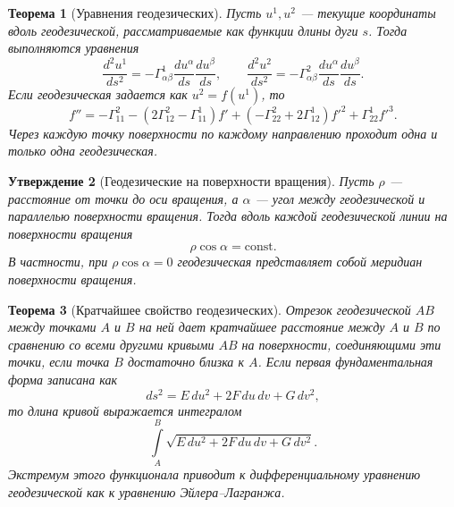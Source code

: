 \documentclass[12pt,a4paper]{article}
\newtheorem{theorem}{Теорема}[section]
\newtheorem{proposition}[theorem]{Утверждение}
\theoremstyle{definition}
\begin{document}
\begin{theorem}[Уравнения геодезических]
Пусть $u^1,u^2$ --- текущие координаты вдоль геодезической, рассматриваемые как функции длины дуги $s$. Тогда выполняются уравнения
\[
\frac{d^2u^1}{ds^2} = -\Gamma_{\alpha\beta}^1 \frac{du^\alpha}{ds}\frac{du^\beta}{ds}, \qquad
\frac{d^2u^2}{ds^2} = -\Gamma_{\alpha\beta}^2 \frac{du^\alpha}{ds}\frac{du^\beta}{ds}.
\]
Если геодезическая задается как $u^2=f(u^1)$, то
\[
f'' = -\Gamma_{11}^2 - (2\Gamma_{12}^2 - \Gamma_{11}^1) f' + (-\Gamma_{22}^2 + 2\Gamma_{12}^1) f'^2 + \Gamma_{22}^1 f'^3.
\]
Через каждую точку поверхности по каждому направлению проходит одна и только одна геодезическая.
\end{theorem}

\begin{proposition}[Геодезические на поверхности вращения]
Пусть $\rho$ --- расстояние от точки до оси вращения, а $\alpha$ --- угол между геодезической и параллелью поверхности вращения. Тогда вдоль каждой геодезической линии на поверхности вращения
\[
\rho \cos\alpha = \text{const}.
\]
В частности, при $\rho \cos\alpha = 0$ геодезическая представляет собой меридиан поверхности вращения.
\end{proposition}

\begin{theorem}[Кратчайшее свойство геодезических]
Отрезок геодезической $AB$ между точками $A$ и $B$ на ней дает кратчайшее расстояние между $A$ и $B$ по сравнению со всеми другими кривыми $AB$ на поверхности, соединяющими эти точки, если точка $B$ достаточно близка к $A$.
Если первая фундаментальная форма записана как
\[
ds^2 = E\,du^2 + 2F\,du\,dv + G\,dv^2,
\]
то длина кривой выражается интегралом
\[
\int\limits_A^B \sqrt{E\,du^2 + 2F\,du\,dv + G\,dv^2}.
\]
Экстремум этого функционала приводит к дифференциальному уравнению геодезической как к уравнению Эйлера--Лагранжа.
\end{theorem}
\end{document}
